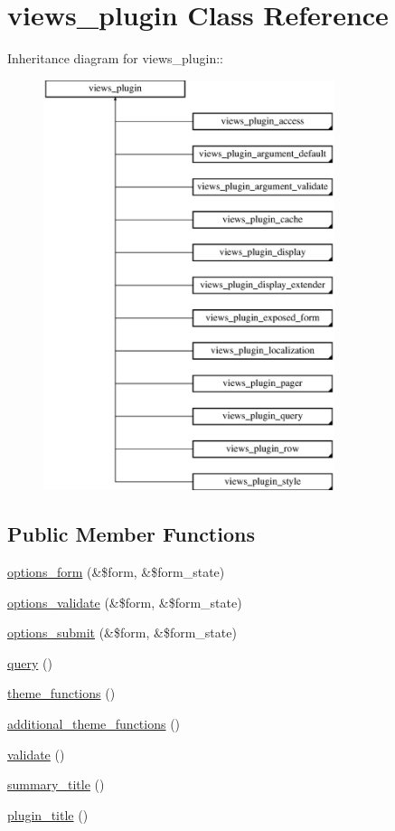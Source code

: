 \hypertarget{classviews__plugin}{
\section{views\_\-plugin Class Reference}
\label{classviews__plugin}
}
Inheritance diagram for views\_\-plugin::\begin{figure}[H]
\begin{center}
\leavevmode
\includegraphics[height=12cm]{classviews__plugin}
\end{center}
\end{figure}
\subsection*{Public Member Functions}
\begin{DoxyCompactItemize}
\item 
\hyperlink{classviews__plugin_a1aaed8da1afd9f45293a37358c159837}{options\_\-form} (\&\$form, \&\$form\_\-state)
\item 
\hyperlink{classviews__plugin_a46d72eb35feea36fed83cd1355a47431}{options\_\-validate} (\&\$form, \&\$form\_\-state)
\item 
\hyperlink{classviews__plugin_a442b0f392deb52725ec8159e05654e06}{options\_\-submit} (\&\$form, \&\$form\_\-state)
\item 
\hyperlink{classviews__plugin_a10ac07c47c4a8735786f9fcc38548587}{query} ()
\item 
\hyperlink{classviews__plugin_ab20d2d49f24db9ee7f162341564fd2fd}{theme\_\-functions} ()
\item 
\hyperlink{classviews__plugin_a5c5fb9783079362378d804c94b142b9f}{additional\_\-theme\_\-functions} ()
\item 
\hyperlink{classviews__plugin_aaf004b6a719837f08a1ffe4a1cf4d442}{validate} ()
\item 
\hyperlink{classviews__plugin_a9a4aaece48a7cf465dd95d59a3bc5ea1}{summary\_\-title} ()
\item 
\hyperlink{classviews__plugin_a8e3f150d04decf60cfe7220f2d220065}{plugin\_\-title} ()
\end{DoxyCompactItemize}
